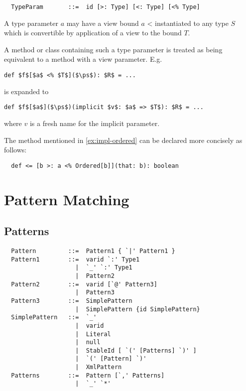 \syntax\begin{lstlisting}
  TypeParam       ::=  id [>: Type] [<: Type] [<% Type]
\end{lstlisting}

A type parameter $a$ may have a view bound
\lstinline@$a$ <% $T$@. In this case the type parameter may be
instantiated to any type $S$ which is convertible by application of a
view to the bound $T$.

A method or class containing such a type parameter is treated as being
equivalent to a
method with a view parameter. E.g.
\begin{lstlisting}
def $f$[$a$ <% $T$]($\ps$): $R$ = ...
\end{lstlisting}
is expanded to 
\begin{lstlisting}
def $f$[$a$]($\ps$)(implicit $v$: $a$ => $T$): $R$ = ...
\end{lstlisting}
where $v$ is a fresh name for the implicit parameter.

\example The \code{<=} method mentioned in \ref{ex:impl-ordered} can be declared
more concisely as follows:
\begin{lstlisting}
  def <= [b >: a <% Ordered[b]](that: b): boolean
\end{lstlisting}

\chapter{Pattern Matching}

\section{Patterns}

\label{sec:patterns}

\syntax\begin{verbatim}
  Pattern         ::=  Pattern1 { `|' Pattern1 }
  Pattern1        ::=  varid `:' Type1
                    |  `_' `:' Type1
                    |  Pattern2
  Pattern2        ::=  varid [`@' Pattern3]
                    |  Pattern3
  Pattern3        ::=  SimplePattern 
                    |  SimplePattern {id SimplePattern}
  SimplePattern   ::=  `_'
                    |  varid
                    |  Literal
                    |  null
                    |  StableId [ `(' [Patterns] `)' ]
                    |  `(' [Pattern] `)'
                    |  XmlPattern
  Patterns        ::=  Pattern [`,' Patterns]
                    |  `_' `*'
\end{verbatim}

